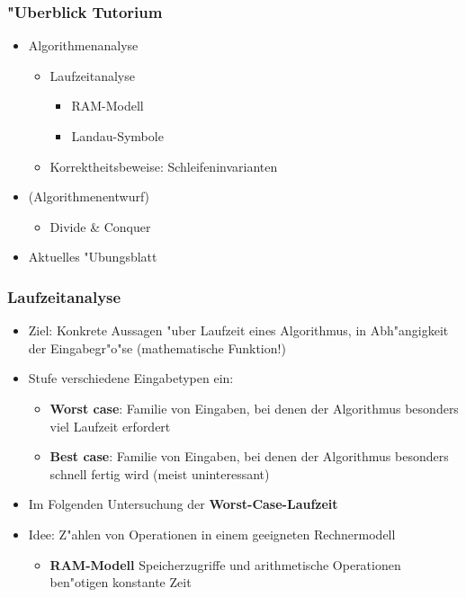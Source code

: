 \documentclass[t]{beamer}
\begin{document}
\begin{frame}
  \frametitle{"Uberblick Tutorium}
  \begin{itemize}
  \item Algorithmenanalyse
    \begin{itemize}
    \item Laufzeitanalyse
      \begin{itemize}
      \item RAM-Modell
      \item Landau-Symbole
      \end{itemize}
    \item Korrektheitsbeweise: Schleifeninvarianten
    \end{itemize}
  \item (Algorithmenentwurf)
    \begin{itemize}
    \item Divide \& Conquer
    \end{itemize}
  \item Aktuelles "Ubungsblatt
  \end{itemize}
\end{frame}

\begin{frame}
  \frametitle{Laufzeitanalyse}
  \begin{itemize}
  \item Ziel: Konkrete Aussagen "uber Laufzeit eines Algorithmus,
        in Abh"angigkeit der Eingabegr"o"se (mathematische Funktion!)
  \item Stufe verschiedene Eingabetypen ein:
    \begin{itemize}
    \item \textbf{Worst case}: Familie von Eingaben, bei denen der Algorithmus
          besonders viel Laufzeit erfordert
    \item \textbf{Best case}: Familie von Eingaben, bei denen der Algorithmus
          besonders schnell fertig wird (meist uninteressant)
    \end{itemize}
  \item Im Folgenden Untersuchung der \textbf{Worst-Case-Laufzeit}
  \item Idee: Z"ahlen von Operationen in einem geeigneten Rechnermodell
    \begin{itemize}
    \item \textbf{RAM-Modell} Speicherzugriffe und arithmetische Operationen
          ben"otigen konstante Zeit
    \end{itemize}
  \end{itemize}
\end{frame}
\end{document}
